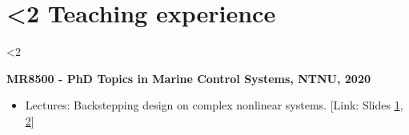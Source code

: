 \documentclass[10pt]{ctexart}
\begin{document}
\vspace{-2em}
\section*{\textbf{\ifnum\value{num}<2 {Teaching experience}  \fi}}\vspace{-1.5em}
\ifnum\value{num}<2 {
    \begin{minipage}{\textwidth}
    \textbf{MR8500 - PhD Topics in Marine Control Systems, NTNU, 2020}\vspace{-1.00em}
    \begin{itemize}[label={}] \setlength\itemsep{0.5em}
    \item Lectures: Backstepping design on complex nonlinear systems. [Link: Slides \href{https://www.zhengru.ren/slides/Backstepping_lecture1.pdf}{1}, \href{https://www.zhengru.ren/slides/Backstepping_lecture2.pdf}{2}]
    \end{itemize}
    \end{minipage}
}\fi
\vspace*{0.1em}

\end{document}
